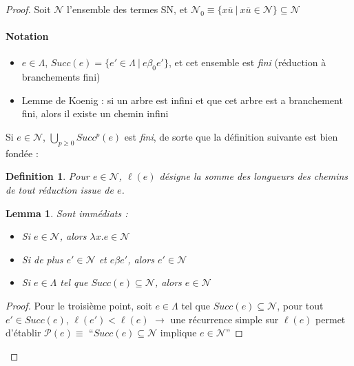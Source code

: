 \documentclass{article}
\newtheorem{lemma}{Lemma}
\newtheorem{defi}{Definition}
\newcommand\lterm[2]{\lambda #1. #2}
\begin{document}
\begin{proof}
Soit $\mathcal{N}$ l'ensemble des termes SN, et $\mathcal{N}_0 \equiv \{  x\overline{u} \:|\: x\overline{u} \in \mathcal{N}\} \subseteq \mathcal{N}$
\paragraph{Notation}
\begin{itemize}
\item $e\in \Lambda$, $Succ(e)=\{e'\in \Lambda \:|\: e\beta_0 e' \}$, et cet ensemble est \emph{fini} (réduction à branchements fini)
\item Lemme de Koenig : si un arbre est infini et que cet arbre est a branchement fini, alors il existe un chemin infini
\end{itemize}

Si $e\in \mathcal{N}$, $\bigcup_{p\geq 0} Succ^p (e)$ est \emph{fini}, de sorte que la définition suivante est bien fondée :

\begin{defi}
Pour $e\in \mathcal{N}$, $\ell(e)$ désigne la somme des longueurs des chemins de tout réduction issue de $e$.
\end{defi}

\begin{lemma}
Sont immédiats :
\begin{itemize}
\item Si $e\in \mathcal{N}$, alors $\lterm{x}{e} \in \mathcal{N}$
\item Si de plus $e' \in \mathcal{N}$ et $e \beta e'$, alors $e' \in \mathcal{N}$
\item Si $e \in \Lambda$ tel que $Succ(e)\subseteq \mathcal{N}$, alors $e\in \mathcal{N}$
\end{itemize}
\end{lemma}
\begin{proof}
Pour le troisième point, soit $e\in \Lambda$ tel que $Succ(e)\subseteq \mathcal{N}$, pour tout $e' \in Succ(e)$, $\ell (e') < \ell(e)$ $\to$ une récurrence simple sur $\ell(e)$ permet d'établir $\mathcal{P}(e) \equiv$ ``$Succ(e) \subseteq \mathcal{N}$ implique $e\in \mathcal{N}$''
\end{proof}




\end{proof}
\end{document}
